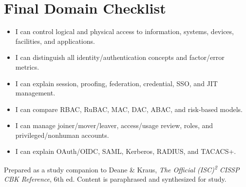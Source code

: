 \documentclass[10pt,letterpaper]{article}
\begin{document}
\section{\color{navy}Final Domain Checklist}
\begin{itemize}[label=\(\square\)]
\item I can control logical and physical access to information, systems, devices, facilities, and applications.
\item I can distinguish all identity/authentication concepts and factor/error metrics.
\item I can explain session, proofing, federation, credential, SSO, and JIT management.
\item I can compare RBAC, RuBAC, MAC, DAC, ABAC, and risk-based models.
\item I can manage joiner/mover/leaver, access/usage review, roles, and privileged/nonhuman accounts.
\item I can explain OAuth/OIDC, SAML, Kerberos, RADIUS, and TACACS+.
\end{itemize}
\vfill{\footnotesize\color{teal}Prepared as a study companion to Deane \& Kraus, \textit{The Official (ISC)\textsuperscript{2} CISSP CBK Reference}, 6th ed. Content is paraphrased and synthesized for study.}
\end{document}
